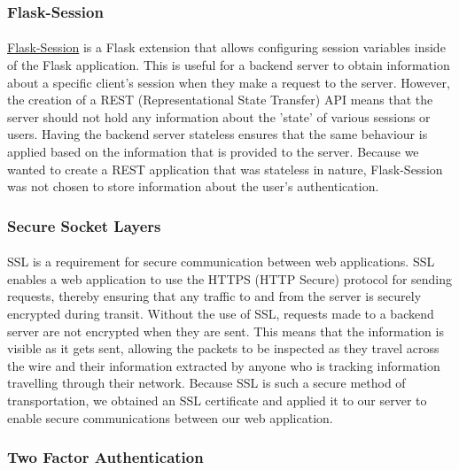 \documentclass[12pt]{article}
\begin{document}
	\subsubsection{Flask-Session}	
	\paragraph{}
		\href{https://pythonhosted.org/Flask-Session/}{Flask-Session} is a Flask extension that allows configuring session variables inside of the Flask application. This is useful for a backend server to obtain information about a specific client's session when they make a request to the server. However, the creation of a REST (Representational State Transfer) API means that the server should not hold any information about the 'state' of various sessions or users. Having the backend server stateless ensures that the same behaviour is applied based on the information that is provided to the server. Because we wanted to create a REST application that was stateless in nature, Flask-Session was not chosen to store information about the user's authentication.
		
	\subsubsection{Secure Socket Layers}	
	\paragraph{}
		SSL is a requirement for secure communication between web applications. SSL enables a web application to use the HTTPS (HTTP Secure) protocol for sending requests, thereby ensuring that any traffic to and from the server is securely encrypted during transit. Without the use of SSL, requests made to a backend server are not encrypted when they are sent. This means that the information is visible as it gets sent, allowing the packets to be inspected as they travel across the wire and their information extracted by anyone who is tracking information travelling through their network. Because SSL is such a secure method of transportation, we obtained an SSL certificate and applied it to our server to enable secure communications between our web application.
	
	\subsubsection{Two Factor Authentication}
\end{document}
